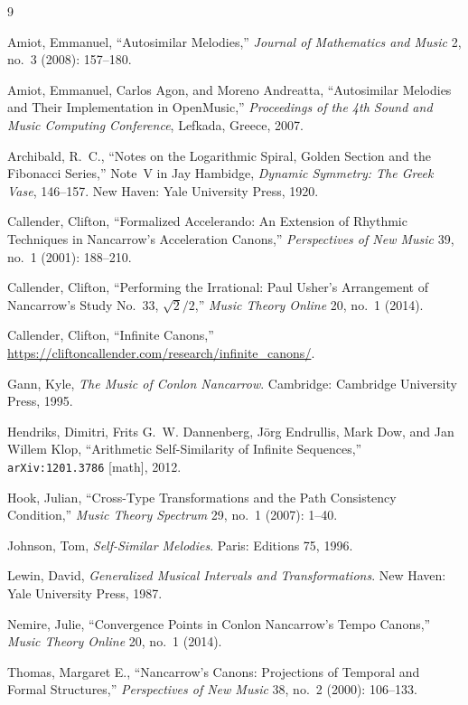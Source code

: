 \documentclass[11pt]{article}
\theoremstyle{plain}
\theoremstyle{definition}
\theoremstyle{remark}
\begin{document}
\begin{thebibliography}{9}

Amiot, Emmanuel, ``Autosimilar Melodies,'' \emph{Journal of Mathematics and Music} 2, no.~3 (2008): 157--180.

Amiot, Emmanuel, Carlos Agon, and Moreno Andreatta, ``Autosimilar Melodies and Their Implementation in OpenMusic,'' \emph{Proceedings of the 4th Sound and Music Computing Conference}, Lefkada, Greece, 2007.

Archibald, R.~C., ``Notes on the Logarithmic Spiral, Golden Section and the Fibonacci Series,'' Note~V in Jay Hambidge, \emph{Dynamic Symmetry: The Greek Vase}, 146--157. New Haven: Yale University Press, 1920.

Callender, Clifton, ``Formalized Accelerando: An Extension of Rhythmic Techniques in Nancarrow's Acceleration Canons,'' \emph{Perspectives of New Music} 39, no.~1 (2001): 188--210.

Callender, Clifton, ``Performing the Irrational: Paul Usher's Arrangement of Nancarrow's Study No.~33, $\sqrt{2}/2$,'' \emph{Music Theory Online} 20, no.~1 (2014).

Callender, Clifton, ``Infinite Canons,'' \url{https://cliftoncallender.com/research/infinite_canons/}.

Gann, Kyle, \emph{The Music of Conlon Nancarrow}. Cambridge: Cambridge University Press, 1995.

Hendriks, Dimitri, Frits G.~W. Dannenberg, J\"{o}rg Endrullis, Mark Dow, and Jan Willem Klop, ``Arithmetic Self-Similarity of Infinite Sequences,'' \texttt{arXiv:1201.3786} [math], 2012.

Hook, Julian, ``Cross-Type Transformations and the Path Consistency Condition,'' \emph{Music Theory Spectrum} 29, no.~1 (2007): 1--40.

Johnson, Tom, \emph{Self-Similar Melodies}. Paris: Editions 75, 1996.

Lewin, David, \emph{Generalized Musical Intervals and Transformations}. New Haven: Yale University Press, 1987.

Nemire, Julie, ``Convergence Points in Conlon Nancarrow's Tempo Canons,''  \emph{Music Theory Online} 20, no.~1 (2014).

Thomas, Margaret E., ``Nancarrow's Canons: Projections of Temporal and Formal Structures,'' \emph{Perspectives of New Music} 38, no.~2 (2000): 106--133.


\end{thebibliography}
\end{document}
